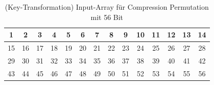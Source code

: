 \begin{table}[H]
    \centering
    \begin{tabular}{|*{14}{c|}}
        \hline
        \cellcolor{red-1}1 & \cellcolor{red-1}2 & \cellcolor{red-1}3 & \cellcolor{red-1}4 & 
        \cellcolor{red-1}5 & \cellcolor{red-1}6 & \cellcolor{red-1}7 & \cellcolor{red-1}8 & 
        \cellcolor{orange-1}9 & \cellcolor{orange-1}10 & \cellcolor{orange-1}11 & \cellcolor{orange-1}12 & 
        \cellcolor{orange-1}13 & \cellcolor{orange-1}14\\
        \hline
        \cellcolor{orange-1}15 & \cellcolor{orange-1}16 & 
        \cellcolor{yellow-1}17 & \cellcolor{yellow-1}18 & \cellcolor{yellow-1}19 & \cellcolor{yellow-1}20 & 
        \cellcolor{yellow-1}21 & \cellcolor{yellow-1}22 & \cellcolor{yellow-1}23 & \cellcolor{yellow-1}24 & 
        \cellcolor{green-1}25 & \cellcolor{green-1}26 & \cellcolor{green-1}27 & \cellcolor{green-1}28 \\
        \hline
        \cellcolor{green-1}29 & \cellcolor{green-1}30 & \cellcolor{green-1}31 & \cellcolor{green-1}32 &
        \cellcolor{cyan-1}33 & \cellcolor{cyan-1}34 & \cellcolor{cyan-1}35 & \cellcolor{cyan-1}36 & 
        \cellcolor{cyan-1}37 & \cellcolor{cyan-1}38 & \cellcolor{cyan-1}39 & \cellcolor{cyan-1}40 & 
        \cellcolor{blue-1}41 & \cellcolor{blue-1}42 \\
        \hline 
        \cellcolor{blue-1}43 & \cellcolor{blue-1}44 & 
        \cellcolor{blue-1}45 & \cellcolor{blue-1}46 & \cellcolor{blue-1}47 & \cellcolor{blue-1}48 &
        \cellcolor{purple-1}49 & \cellcolor{purple-1}50 & \cellcolor{purple-1}51 & \cellcolor{purple-1}52 & 
        \cellcolor{purple-1}53 & \cellcolor{purple-1}54 & \cellcolor{purple-1}55 & \cellcolor{purple-1}56 \\
        \hline
    \end{tabular}
    \caption{(Key-Transformation) Input-Array für Compression Permutation mit 56 Bit}
    \label{tab:key-tranformation-3}
\end{table}

